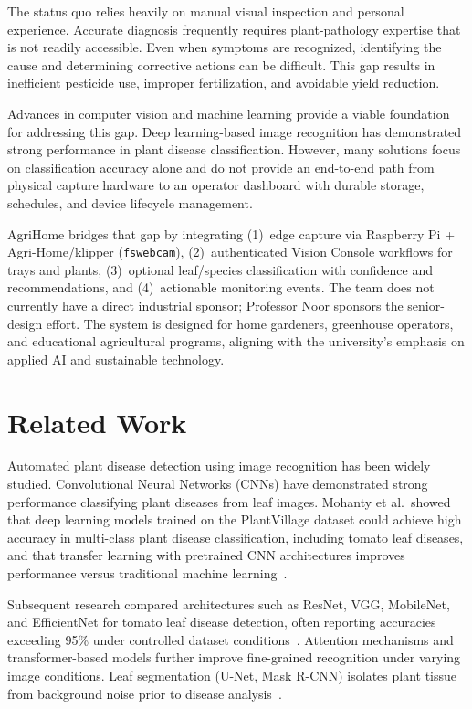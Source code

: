 \documentclass[11pt,letterpaper]{article}
\begin{document}
The status quo relies heavily on manual visual inspection and personal experience. Accurate diagnosis
frequently requires plant-pathology expertise that is not readily accessible. Even when symptoms are
recognized, identifying the cause and determining corrective actions can be difficult. This gap results
in inefficient pesticide use, improper fertilization, and avoidable yield reduction.

Advances in computer vision and machine learning provide a viable foundation for addressing this gap.
Deep learning-based image recognition has demonstrated strong performance in plant disease
classification. However, many solutions focus on classification accuracy alone and do not provide an
end-to-end path from physical capture hardware to an operator dashboard with durable storage,
schedules, and device lifecycle management.

AgriHome bridges that gap by integrating (1)~edge capture via Raspberry Pi + Agri-Home/klipper
(\texttt{fswebcam}), (2)~authenticated Vision Console workflows for trays and plants, (3)~optional leaf/species
classification with confidence and recommendations, and (4)~actionable monitoring events. The team
does not currently have a direct industrial sponsor; Professor Noor sponsors the senior-design effort.
The system is designed for home gardeners, greenhouse operators, and educational agricultural
programs, aligning with the university's emphasis on applied AI and sustainable technology.

\section{Related Work}
Automated plant disease detection using image recognition has been widely studied. Convolutional
Neural Networks (CNNs) have demonstrated strong performance classifying plant diseases from leaf
images. Mohanty et al.\ showed that deep learning models trained on the PlantVillage dataset could
achieve high accuracy in multi-class plant disease classification, including tomato leaf diseases, and
that transfer learning with pretrained CNN architectures improves performance versus traditional
machine learning~\cite{mohanty2016}.

Subsequent research compared architectures such as ResNet, VGG, MobileNet, and EfficientNet for
tomato leaf disease detection, often reporting accuracies exceeding 95\% under controlled dataset
conditions~\cite{tomato-cnn}. Attention mechanisms and transformer-based models further improve
fine-grained recognition under varying image conditions. Leaf segmentation (U-Net, Mask R-CNN)
isolates plant tissue from background noise prior to disease analysis~\cite{unet-leaf}.
\end{document}
